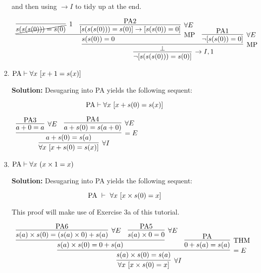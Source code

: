 \documentclass[11pt]{report}
\begin{document}
\begin{enumerate}
\begin{enumerate}
		and then using $\to I$ to tidy up at the end. 

		\begin{mdframed}
			\begin{center}
				\footnotesize{$\begin{array}{c}
					\infer[\to I,1]{\lnot[s(s(s(0))) = s(0)]}
						{\infer[\MP]{\bot}
							{\infer[\MP]{s(s(0))=0}
							{\infer[1]{\cancel{s(s(s(0))) = s(0)}}{}
							&
							\infer[\forall E]{[s(s(s(0)))=s(0)] \to [s(s(0)) = 0]}
								{\PA 2}}
						&
						\infer[\forall E]{\lnot[s(s(0))=0]}
							{\PA 1}}}
				\end{array}$}
			\end{center}
		\end{mdframed}

		\newpage
		\item $\text{PA} \vdash \forall x \ [x + 1 = s(x)]$
		
		{\bf Solution:} Desugaring into PA yields the following sequent:

		$$\text{PA} \vdash \forall x \ [x + s(0) = s(x)]$$

		\begin{mdframed}
			\begin{center}
				$\begin{array}{c}
					\infer[\forall I]{\forall x \ [x + s(0) = s(x)]}
						{\infer[=E]{a + s(0) = s(a)}
							{\infer[\forall E]{a + 0 = a}{\PA 3}
							&
							\infer[\forall E]{a + s(0) = s(a+0)}{\PA 4}}}
				\end{array}$
			\end{center}
		\end{mdframed}
		
		\item $\text{PA} \vdash \forall x \ (x \times 1 = x)$ 
		
		{\bf Solution:} Desugaring into PA yields the following sequent: 

		$$\text{PA} \ \vdash \ \forall x \ [x \times s(0) = x] $$

		This proof will make use of Exercise 3a of this tutorial. 

		\begin{mdframed}
			\begin{center}
				\footnotesize{$\begin{array}{c}
					\infer[\forall I]{\forall x \ [x \times s(0) = x]}
						{\infer[=E]{s(a) \times s(0) = s(a)}
							{\infer[]{s(a) \times s(0) = 0 + s(a)}
								{\infer[\forall E]{s(a) \times s(0) = (s(a) \times 0) + s(a)}{\PA 6}
								&
								\infer[\forall E]{s(a) \times 0 = 0}{\PA 5}}
							&
							\infer[\THM]{0 + s(a) = s(a)}{\PA}}}
				\end{array}$}
			\end{center}
		\end{mdframed}


\end{enumerate}
\end{enumerate}
\end{document}
